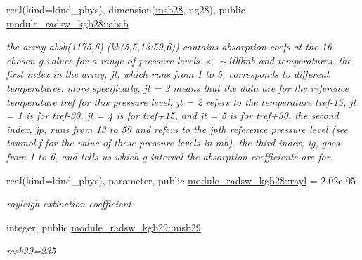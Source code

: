\begin{DoxyCompactItemize}
\mbox{\label{group__module__radsw__kgbnn_gac3834ddd9d9e2106dc739094c800d09b}} 
real(kind=kind\+\_\+phys), dimension(\hyperlink{group__module__radsw__kgbnn_ga55d73e39264b431135c6a9c809e20a94}{msb28}, ng28), public \hyperlink{group__module__radsw__kgbnn_gac3834ddd9d9e2106dc739094c800d09b}{module\+\_\+radsw\+\_\+kgb28\+::absb}
\begin{DoxyCompactList}\small\item\em the array absb(1175,6) (kb(5,5,13\+:59,6)) contains absorption coefs at the 16 chosen g-\/values for a range of pressure levels $<$ $\sim$100mb and temperatures. the first index in the array, jt, which runs from 1 to 5, corresponds to different temperatures. more specifically, jt = 3 means that the data are for the reference temperature tref for this pressure level, jt = 2 refers to the temperature tref-\/15, jt = 1 is for tref-\/30, jt = 4 is for tref+15, and jt = 5 is for tref+30. the second index, jp, runs from 13 to 59 and refers to the jpth reference pressure level (see taumol.\+f for the value of these pressure levels in mb). the third index, ig, goes from 1 to 6, and tells us which g-\/interval the absorption coefficients are for. \end{DoxyCompactList}\item 
\mbox{\label{group__module__radsw__kgbnn_gaf3641febf88e97741b2cd86a56eda843}} 
real(kind=kind\+\_\+phys), parameter, public \hyperlink{group__module__radsw__kgbnn_gaf3641febf88e97741b2cd86a56eda843}{module\+\_\+radsw\+\_\+kgb28\+::rayl} = 2.\+02e-\/05
\begin{DoxyCompactList}\small\item\em rayleigh extinction coefficient \end{DoxyCompactList}\item 
\mbox{\label{group__module__radsw__kgbnn_gadd8e18a273d5fa133f22fb47c4d722da}} 
integer, public \hyperlink{group__module__radsw__kgbnn_gadd8e18a273d5fa133f22fb47c4d722da}{module\+\_\+radsw\+\_\+kgb29\+::msb29}
\begin{DoxyCompactList}\small\item\em msb29=235 \end{DoxyCompactList}\item 
\mbox{\label{group__module__radsw__kgbnn_gace849342fcb0d18d825318a2ee26ce0e}} 

\end{DoxyCompactItemize}
